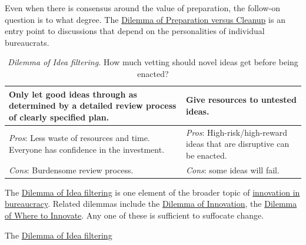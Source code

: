 Even when there is consensus around the value of preparation, the follow-on question is to what degree. 
The \href{table:emergencies-vs-ignore}{Dilemma of Preparation versus Cleanup} is an entry point to discussions that depend on the personalities of individual bureaucrats. 


\begin{center}
\begin{table}[H] %
\begin{tabular}{ | m{\dilemmatablewidth}| m{\dilemmatablewidth} | } 
  \hline
  \textbf{Only let good ideas through as determined by a detailed review process of clearly specified plan.} &
  \textbf{Give resources to untested ideas.} \\
  \hline
  \textit{Pros}: Less waste of resources and time. Everyone has confidence in the investment. & 
  \textit{Pros}: High-risk/high-reward ideas that are disruptive can be enacted. \\
  \hline
  \textit{Cons}: Burdensome review process. & 
  \textit{Cons}: some ideas will fail. \\
  \hline
\end{tabular}
\caption{
\textit{Dilemma of Idea filtering.}
How much vetting should novel ideas get before being enacted?
}
\label{table:idea-filtering}
\end{table}
\end{center}

The \href{table:idea-filtering}{Dilemma of Idea filtering} is one element of the broader topic of \hyperref[sec:innovation]{innovation in bureaucracy}. Related dilemmas include the \href{table:disruptive-or-iterative}{Dilemma of Innovation}, the \href{table:where-to-innovate}{Dilemma of Where to Innovate}. Any one of these is sufficient to suffocate change.  

The \href{table:idea-filtering}{Dilemma of Idea filtering}



